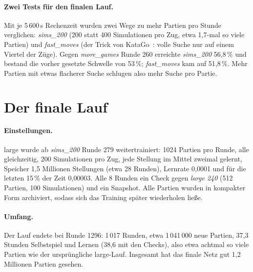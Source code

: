 \documentclass[11pt,a4paper]{article}
\begin{document}
\paragraph{Zwei Tests für den finalen Lauf.} Mit je 5\,600\,s Rechenzeit wurden zwei Wege zu mehr Partien
pro Stunde verglichen: \emph{sims\_200} (200 statt 400 Simulationen pro Zug, etwa 1{,}7-mal so viele
Partien) und \emph{fast\_moves} (der Trick von KataGo~\cite{katago}: volle Suche nur auf einem Viertel der
Züge). Gegen \emph{more\_games} Runde 260 erreichte \emph{sims\_200} 56{,}8\,\% und bestand die vorher
gesetzte Schwelle von 53\,\%; \emph{fast\_moves} kam auf 51{,}8\,\%. Mehr Partien mit etwas flacherer
Suche schlugen also mehr Suche pro Partie.

\section{Der finale Lauf}

\paragraph{Einstellungen.} large wurde ab \emph{sims\_200} Runde 279 weitertrainiert: 1024 Partien pro
Runde, alle gleichzeitig, 200 Simulationen pro Zug, jede Stellung im Mittel zweimal gelernt, Speicher
1{,}5 Millionen Stellungen (etwa 28 Runden), Lernrate 0{,}0001 und für die letzten 15\,\% der Zeit
0{,}00003. Alle 8 Runden ein Check gegen \emph{large 240} (512 Partien, 100 Simulationen) und ein Snapshot.
Alle Partien wurden in kompakter Form archiviert, sodass sich das Training später wiederholen ließe.

\paragraph{Umfang.} Der Lauf endete bei Runde 1296: 1\,017 Runden, etwa 1\,041\,000 neue Partien, 37{,}3
Stunden Selbstspiel und Lernen (38{,}6 mit den Checks), also etwa achtmal so viele Partien wie der
ursprüngliche large-Lauf. Insgesamt hat das finale Netz gut 1{,}2 Millionen Partien gesehen.
\end{document}
